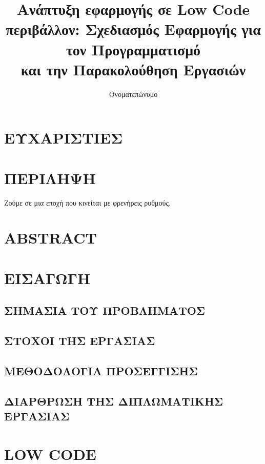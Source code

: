 \documentclass{template}
\title{Ανάπτυξη εφαρμογής σε Low Code περιβάλλον: Σχεδιασμός Εφαρμογής για τον Προγραμματισμό \\
	και την Παρακολούθηση Εργασιών}
\author{Ονοματεπώνυμο}
\begin{document}
\maketitle

\frontmatter

	\chapter{ΕΥΧΑΡΙΣΤΙΕΣ}
	\newpage

	\chapter{ΠΕΡΙΛΗΨΗ}
	Ζούμε σε μια εποχή που κινείται με φρενήρεις ρυθμούς.
	\newpage

	\chapter{ABSTRACT}
	\newpage


	\tableofcontents
	\newpage

	\listoffigures
	\listoftables

\mainmatter

    \chapter{ΕΙΣΑΓΩΓΗ}

    \section{ΣΗΜΑΣΙΑ ΤΟΥ ΠΡΟΒΛΗΜΑΤΟΣ}

    \section{ΣΤΟΧΟΙ ΤΗΣ ΕΡΓΑΣΙΑΣ}
    \section{ΜΕΘΟΔΟΛΟΓΙΑ ΠΡΟΣΕΓΓΙΣΗΣ}
    \section{ΔΙΑΡΘΡΩΣΗ ΤΗΣ ΔΙΠΛΩΜΑΤΙΚΗΣ ΕΡΓΑΣΙΑΣ}

    \chapter{LOW CODE}
\end{document}
